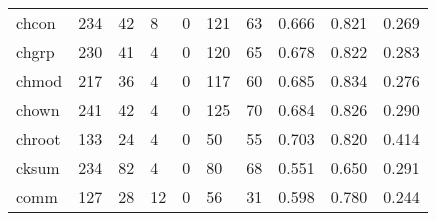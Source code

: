 \begin{longtable}{lp{1.3cm}p{1.3cm}p{1.3cm}p{1.3cm}p{1.3cm}p{1.3cm}p{1.3cm}p{1.3cm}p{1.3cm}}
chcon     &                    234 &                                 42 &                                 8 &                                0 &                               121 &                              63 &                                0.666 &                                  0.821 &                                0.269 \\
chgrp     &                    230 &                                 41 &                                 4 &                                0 &                               120 &                              65 &                                0.678 &                                  0.822 &                                0.283 \\
chmod     &                    217 &                                 36 &                                 4 &                                0 &                               117 &                              60 &                                0.685 &                                  0.834 &                                0.276 \\
chown     &                    241 &                                 42 &                                 4 &                                0 &                               125 &                              70 &                                0.684 &                                  0.826 &                                0.290 \\
chroot    &                    133 &                                 24 &                                 4 &                                0 &                                50 &                              55 &                                0.703 &                                  0.820 &                                0.414 \\
cksum     &                    234 &                                 82 &                                 4 &                                0 &                                80 &                              68 &                                0.551 &                                  0.650 &                                0.291 \\
comm      &                    127 &                                 28 &                                12 &                                0 &                                56 &                              31 &                                0.598 &                                  0.780 &                                0.244 \\

\end{longtable}
